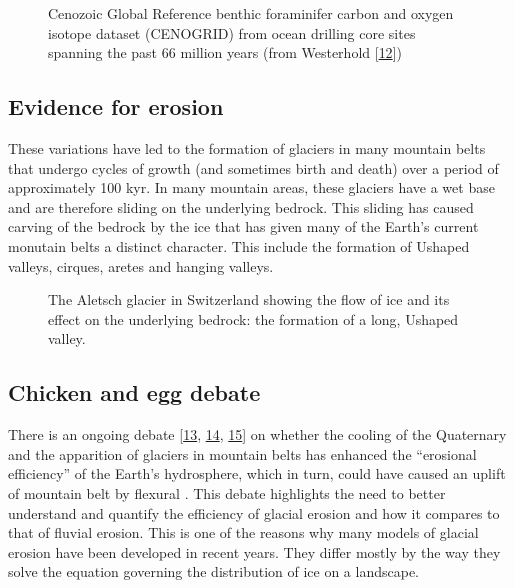 \documentclass[letterpaper,10pt,english]{jupyterBook}
\let\sphinxpxdimen\pdfpxdimen\else\newdimen\sphinxpxdimen
\begin{document}
\begin{figure}[htbp]
\centering
\capstart

\noindent\sphinxincludegraphics[height=250\sphinxpxdimen]{{westerhold}.png}
\caption{Cenozoic Global Reference benthic foraminifer carbon and oxygen isotope dataset (CENOGRID) from ocean drilling core sites spanning the past 66 million years (from Westerhold  {[}\hyperlink{cite.references:id24}{12}{]})}\label{\detokenize{glacial:westerhold-curve}}\end{figure}


\subsection{Evidence for erosion}
\label{\detokenize{glacial:evidence-for-erosion}}
\sphinxAtStartPar
These variations have led to the formation of glaciers in many mountain belts that undergo cycles of growth (and sometimes birth and death) over a period of approximately 100 kyr. In many mountain areas, these glaciers have a wet base and are therefore sliding on the underlying bedrock. This sliding has caused carving of the bedrock by the ice that has given many of the Earth’s current monutain belts a distinct character. This include the formation of U\sphinxhyphen{}shaped valleys, cirques, aretes and hanging valleys.

\begin{figure}[htbp]
\centering
\capstart

\noindent\sphinxincludegraphics[height=150\sphinxpxdimen]{{aletsch}.png}
\caption{The Aletsch glacier in Switzerland showing the flow of ice and its effect on the underlying bedrock: the formation of a long, U\sphinxhyphen{}shaped valley.}\label{\detokenize{glacial:aletsch-glacier}}\end{figure}


\subsection{Chicken and egg debate}
\label{\detokenize{glacial:chicken-and-egg-debate}}
\sphinxAtStartPar
There is an on\sphinxhyphen{}going debate {[}\hyperlink{cite.references:id11}{13}, \hyperlink{cite.references:id12}{14}, \hyperlink{cite.references:id13}{15}{]} on whether the cooling of the Quaternary and the apparition of glaciers in mountain belts has enhanced the “erosional efficiency” of the Earth’s hydrosphere, which in turn, could have caused an uplift of mountain belt by flexural {\hyperref[\detokenize{glossary:term-Isostasy}]{}}. This debate highlights the need to better understand and quantify the efficiency of glacial erosion and how it compares to that of fluvial erosion. This is one of the reasons why many models of glacial erosion have been developed in recent years. They differ mostly by the way they solve the equation governing the distribution of ice on a landscape.
\end{document}
